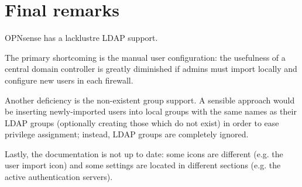 \documentclass{homework}
\newcommand{\opn}{OPNsense\xspace}
\begin{document}
    
    \section{Final remarks}
    \opn has a lacklustre LDAP support.
    
    The primary shortcoming is the manual user configuration: the usefulness of a central domain controller is greatly diminished if admins must import locally and configure new users in each firewall.
    
    Another deficiency is the non-existent group support.
    A sensible approach would be inserting newly-imported users into local groups with the same names as their LDAP groups (optionally creating those which do not exist) in order to ease privilege assignment; instead, LDAP groups are completely ignored.
    
    Lastly, the documentation is not up to date: some icons are different (e.g. the user import icon) and some settings are located in different sections (e.g. the active authentication servers).
\end{document}
